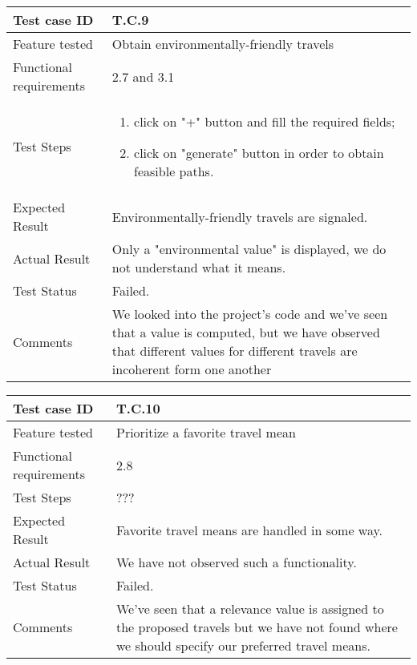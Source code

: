 \begin{table}[H]
	\begin{center}
		\begin{tabular}{ | p{} | p{} | }
		\hline
		Test case ID & T.C.9\\
		\hline
		Feature tested & Obtain environmentally-friendly travels\\
		\hline
		Functional requirements & 2.7 and 3.1\\
		\hline
		Test Steps & 
			\begin{enumerate}
				\item click on "+" button and fill the required fields;
				\item click on "generate" button in order to obtain feasible paths.
			\end{enumerate} \\
		\hline
		Expected Result & Environmentally-friendly travels are signaled.\\
		\hline
		Actual Result & Only a "environmental value" is displayed, we do not understand what it means.\\ 
		\hline
		Test Status & \color{Red}Failed.\\ 
		\hline
		Comments & We looked into the project's code and we've seen that a value is computed, but we have observed that different values for different travels are incoherent form one another \\ 
		\hline
		\end{tabular}
	\end{center}
\end{table}

\begin{table}[H]
	\begin{center}
		\begin{tabular}{ | p{} | p{} | }
		\hline
		Test case ID & T.C.10\\
		\hline
		Feature tested & Prioritize a favorite travel mean\\
		\hline
		Functional requirements & 2.8\\
		\hline
		Test Steps & ???\\
		\hline
		Expected Result & Favorite travel means are handled in some way.\\
		\hline
		Actual Result & We have not observed such a functionality.\\ 
		\hline
		Test Status & \color{Red}Failed.\\ 
		\hline
		Comments & We've seen that a relevance value is assigned to the proposed travels but we have not found where we should specify our preferred travel means. \\ 
		\hline
		\end{tabular}
	\end{center}
\end{table}

